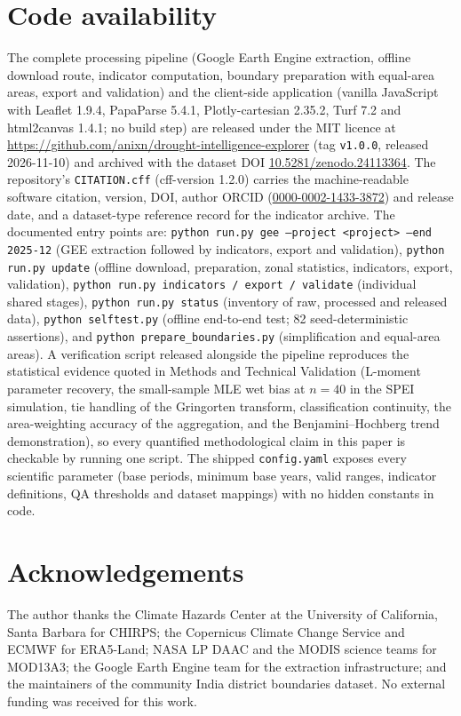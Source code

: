 \documentclass[10pt,a4paper]{article}
\begin{document}
\section*{Code availability}
The complete processing pipeline (Google Earth Engine extraction, offline download route, indicator computation, boundary preparation with equal-area areas, export and validation) and the client-side application (vanilla JavaScript with Leaflet 1.9.4, PapaParse 5.4.1, Plotly-cartesian 2.35.2, Turf 7.2 and html2canvas 1.4.1; no build step) are released under the MIT licence at \url{https://github.com/anixn/drought-intelligence-explorer} (tag \texttt{v1.0.0}, released 2026-11-10) and archived with the dataset DOI \href{https://doi.org/10.5281/zenodo.24113364}{10.5281/zenodo.24113364}. The repository's \texttt{CITATION.cff} (cff-version 1.2.0) carries the machine-readable software citation, version, DOI, author ORCID (\href{https://orcid.org/0000-0002-1433-3872}{0000-0002-1433-3872}) and release date, and a dataset-type reference record for the indicator archive. The documented entry points are: \texttt{python run.py gee --project <project> --end 2025-12} (GEE extraction followed by indicators, export and validation), \texttt{python run.py update} (offline download, preparation, zonal statistics, indicators, export, validation), \texttt{python run.py indicators / export / validate} (individual shared stages), \texttt{python run.py status} (inventory of raw, processed and released data), \texttt{python selftest.py} (offline end-to-end test; 82 seed-deterministic assertions), and \texttt{python prepare\_boundaries.py} (simplification and equal-area areas). A verification script released alongside the pipeline reproduces the statistical evidence quoted in Methods and Technical Validation (L-moment parameter recovery, the small-sample MLE wet bias at $n=40$ in the SPEI simulation, tie handling of the Gringorten transform, classification continuity, the area-weighting accuracy of the aggregation, and the Benjamini--Hochberg trend demonstration), so every quantified methodological claim in this paper is checkable by running one script. The shipped \texttt{config.yaml} exposes every scientific parameter (base periods, minimum base years, valid ranges, indicator definitions, QA thresholds and dataset mappings) with no hidden constants in code.

\section*{Acknowledgements}
The author thanks the Climate Hazards Center at the University of California, Santa Barbara for CHIRPS; the Copernicus Climate Change Service and ECMWF for ERA5-Land; NASA LP DAAC and the MODIS science teams for MOD13A3; the Google Earth Engine team for the extraction infrastructure; and the maintainers of the community India district boundaries dataset. No external funding was received for this work.
\end{document}
